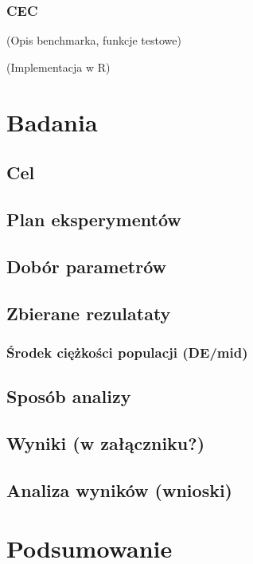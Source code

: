 \documentclass[11pt]{report}
\begin{document}
\subsection{CEC}
\par{
(Opis benchmarka, funkcje testowe)
}
\par{
(Implementacja w R)
}


\chapter{Badania}
\section{Cel}
\section{Plan eksperymentów}
\section{Dobór parametrów}
\section{Zbierane rezulataty}
\subsection{Środek ciężkości populacji (DE/mid)}
\section{Sposób analizy}

\section{Wyniki (w załączniku?)}
\section{Analiza wyników (wnioski)}

\chapter{Podsumowanie}



\nocite{*}

\end{document}
